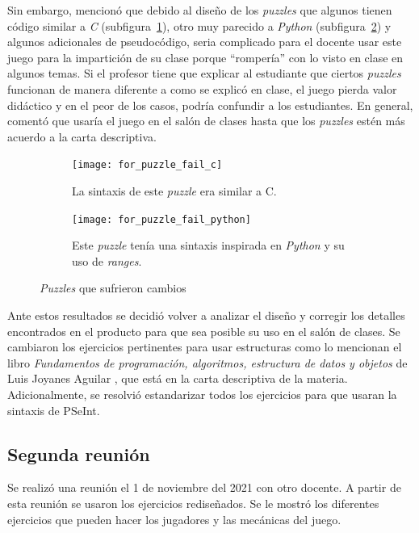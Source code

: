 Sin embargo, mencionó que debido al diseño de los \textit{puzzles} que algunos tienen código similar a \textit{C} (subfigura~\ref{fig:for_puzzle_fail_c}), otro muy parecido a \textit{Python} (subfigura~\ref{fig:for_puzzle_fail_python}) y algunos adicionales de pseudocódigo, seria complicado para el docente usar este juego para la impartición de su clase porque ``rompería'' con lo visto en clase en algunos temas. Si el profesor tiene que explicar al estudiante que ciertos \textit{puzzles} funcionan de manera diferente a como se explicó en clase, el juego pierda valor didáctico y en el peor de los casos, podría confundir a los estudiantes. En general, comentó que usaría el juego en el salón de clases hasta que los \textit{puzzles} estén más acuerdo a la carta descriptiva.
\begin{figure}[H]
    \centering
         \begin{subfigure}{0.4\textwidth}
         \centering
         \texttt{[image: for\_puzzle\_fail\_c]}
         \caption{La sintaxis de este \textit{puzzle} era similar a C.}
         \label{fig:for_puzzle_fail_c}
    \end{subfigure}
    \begin{subfigure}{0.4\textwidth}
         \centering
         \texttt{[image: for\_puzzle\_fail\_python]}
         \caption{Este \textit{puzzle} tenía una sintaxis inspirada en \textit{Python} y su uso de \textit{ranges}.}
         \label{fig:for_puzzle_fail_python}
     \end{subfigure}
    \caption{\textit{Puzzles} que sufrieron cambios}
    \label{fig:puzzle_fail}
\end{figure}

Ante estos resultados se decidió volver a analizar el diseño y corregir los detalles encontrados en el producto para que sea posible su uso en el salón de clases. Se cambiaron los ejercicios pertinentes para usar estructuras como lo mencionan el libro  \textit{Fundamentos de programación, algoritmos, estructura de datos y objetos} de Luis Joyanes Aguilar \cite{luisjoyanesaguilar_2020_fundamentos}, que está en la carta descriptiva de la materia. Adicionalmente, se resolvió estandarizar todos los ejercicios para que usaran la sintaxis de PSeInt. 

\subsection{Segunda reunión}
Se realizó una reunión el 1 de noviembre del 2021 con otro docente. A partir de esta reunión se usaron los ejercicios rediseñados. Se le mostró los diferentes ejercicios que pueden hacer los jugadores y las mecánicas del juego.

